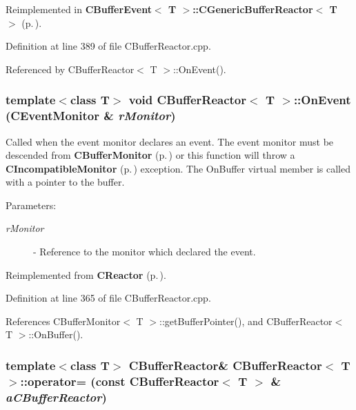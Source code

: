 Reimplemented in {\bf CBuffer\-Event$<$ T $>$::CGeneric\-Buffer\-Reactor$<$ T $>$} {\rm (p.\,\pageref{classCBufferEvent_1_1CGenericBufferReactor_a1})}.

Definition at line 389 of file CBuffer\-Reactor.cpp.

Referenced by CBuffer\-Reactor$<$ T $>$::On\-Event().
\subsubsection{\setlength{\rightskip}{0pt plus 5cm}template$<$class T$>$ void CBuffer\-Reactor$<$ T $>$::On\-Event ({\bf CEvent\-Monitor} \& {\em r\-Monitor})\hspace{0.3cm}{\tt  [virtual]}}\label{classCBufferReactor_a5}


Called when the event monitor declares an event. The event monitor must be descended from {\bf CBuffer\-Monitor} {\rm (p.\,\pageref{classCBufferMonitor})} or  this function will throw a {\bf CIncompatible\-Monitor} {\rm (p.\,\pageref{classCIncompatibleMonitor})} exception. The On\-Buffer virtual member is called with a pointer to the buffer. \begin{Desc}
\item[Parameters: ]\par
\begin{description}
\item[{\em 
r\-Monitor}]- Reference to the monitor which declared the event. \end{description}
\end{Desc}


Reimplemented from {\bf CReactor} {\rm (p.\,\pageref{classCReactor_a6})}.

Definition at line 365 of file CBuffer\-Reactor.cpp.

References CBuffer\-Monitor$<$ T $>$::get\-Buffer\-Pointer(), and CBuffer\-Reactor$<$ T $>$::On\-Buffer().
\subsubsection{\setlength{\rightskip}{0pt plus 5cm}template$<$class T$>$ CBuffer\-Reactor\& CBuffer\-Reactor$<$ T $>$::operator= (const CBuffer\-Reactor$<$ T $>$ \& {\em a\-CBuffer\-Reactor})\hspace{0.3cm}{\tt  [private]}}\label{classCBufferReactor_c1}


